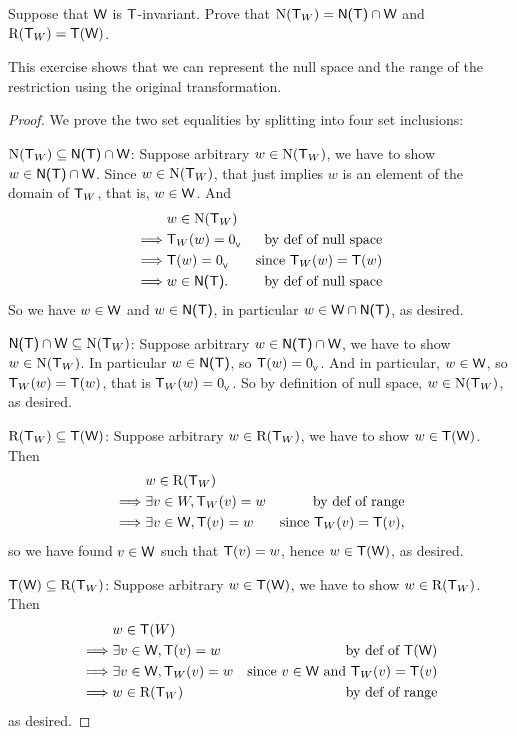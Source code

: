 \begin{exercise} \label{exercise 2.1.33}
Suppose that \(\textsf{W}\) is \(\textsf{T}\)-invariant.
Prove that \(\mathrm{N}(\textsf{T}_W) = \textsf{N(T)} \cap \textsf{W}\) and \(\mathrm{R}(\textsf{T}_W) = \textsf{T}(\textsf{W})\).
\end{exercise}

\begin{note}
This exercise shows that we can represent the null space and the range of the restriction using the original transformation.
\end{note}

\begin{proof} We prove the two set equalities by splitting into four set inclusions:

\(\mathrm{N}(\textsf{T}_W) \subseteq \textsf{N(T)} \cap \textsf{W}\):
Suppose arbitrary \(w \in \mathrm{N}(\textsf{T}_W)\), we have to show \(w \in \textsf{N(T)} \cap \textsf{W}\).
Since \(w \in \mathrm{N}(\textsf{T}_W)\), that just implies \(w\) is an element of the domain of \(\textsf{T}_W\), that is, \(w \in \textsf{W}\).
And
\begin{align*}
             & w \in \mathrm{N}(\textsf{T}_W) \\
    \implies & \textsf{T}_W(w) = 0_{_{\textsf{V}}} & \text{by def of null space} \\
    \implies & \textsf{T}(w) = 0_{_{\textsf{V}}} & \text{since \(\textsf{T}_W(w) = \textsf{T}(w)\)} \\
    \implies & w \in \textsf{N(T)}. & \text{by def of null space}
\end{align*}
So we have \(w \in \textsf{W}\) and \(w \in \textsf{N(T)}\), in particular \(w \in \textsf{W} \cap \textsf{N(T)}\), as desired.

\(\textsf{N(T)} \cap \textsf{W} \subseteq \mathrm{N}(\textsf{T}_W)\):
Suppose arbitrary \(w \in \textsf{N(T)} \cap \textsf{W}\), we have to show \(w \in \mathrm{N}(\textsf{T}_W)\).
In particular \(w \in \textsf{N(T)}\), so \(\textsf{T}(w) = 0_{_{\textsf{V}}}\).
And in particular, \(w \in \textsf{W}\), so \(\textsf{T}_W(w) = \textsf{T}(w)\), that is \(\textsf{T}_W(w) = 0_{_{\textsf{V}}}\).
So by definition of null space, \(w \in \mathrm{N}(\textsf{T}_W)\), as desired.

\(\mathrm{R}(\textsf{T}_W) \subseteq \textsf{T}(\textsf{W})\):
Suppose arbitrary \(w \in \mathrm{R}(\textsf{T}_W)\), we have to show \(w \in \textsf{T}(\textsf{W})\).
Then
\begin{align*}
             & w \in \mathrm{R}(\textsf{T}_W) \\
    \implies & \exists v \in W, \textsf{T}_W(v) = w & \text{by def of range} \\
    \implies & \exists v \in \textsf{W}, \textsf{T}(v) = w & \text{since \(\textsf{T}_W(v) = \textsf{T}(v)\)},
\end{align*}
so we have found \(v \in \textsf{W}\) such that \(\textsf{T}(v) = w\), hence \(w \in \textsf{T}(\textsf{W})\), as desired.

\(\textsf{T}(\textsf{W}) \subseteq \mathrm{R}(\textsf{T}_W)\):
Suppose arbitrary \(w \in \textsf{T}(\textsf{W})\), we have to show \(w \in \mathrm{R}(\textsf{T}_W)\).
Then
\begin{align*}
             & w \in \textsf{T}(W) \\
    \implies & \exists v \in \textsf{W}, \textsf{T}(v) = w & \text{by def of \(\textsf{T}(\textsf{W})\)} \\
    \implies & \exists v \in \textsf{W}, \textsf{T}_W(v) = w & \text{since \(v \in \textsf{W}\) and \(\textsf{T}_W(v) = \textsf{T}(v)\)} \\
    \implies & w \in \mathrm{R}(\textsf{T}_W) & \text{by def of range}
\end{align*}
as desired.
\end{proof}

